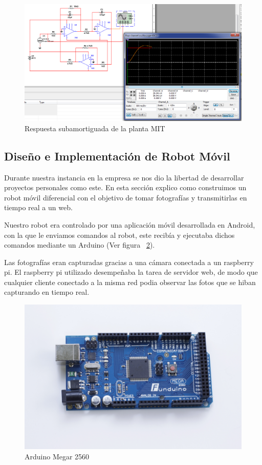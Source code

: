 \begin{figure}[h!]
  \centering
  \includegraphics[scale=0.35]{images/activities/plantas_analogicas/mit-sub.png}
  \caption{Respuesta subamortiguada de la planta MIT}
  \label{fig:mit-sub}
\end{figure}

\clearpage

\subsection{Diseño e Implementación de Robot Móvil}

Durante nuestra instancia en la empresa se nos dio la libertad de desarrollar proyectos personales como este. En esta sección explico como construimos un robot móvil diferencial con el objetivo de tomar fotografías y transmitirlas en tiempo real a un web. 

Nuestro robot era controlado por una aplicación móvil desarrollada en Android, con la que le enviamos comandos al robot, este recibía y ejecutaba dichos comandos mediante un Arduino (Ver figura ~\ref{fig:arduino}).

Las fotografías eran capturadas gracias a una cámara conectada a un raspberry pi. El raspberry pi utilizado desempeñaba la tarea de servidor web, de modo que cualquier cliente conectado a la misma red podia observar las fotos que se hiban capturando en tiempo real.

\begin{figure}[h!]
  \centering
  \includegraphics[scale=0.1]{images/activities/robot_movil/arduino.jpg}
  \caption{Arduino Megar 2560}
  \label{fig:arduino}
\end{figure}


